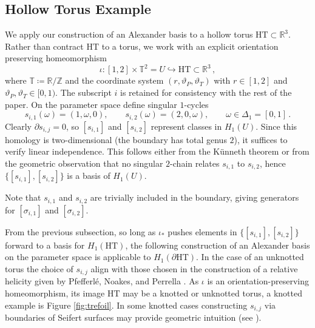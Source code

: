 \documentclass[11pt]{article}
\theoremstyle{plain}
\theoremstyle{definition}
\theoremstyle{remark}
\newcommand{\R}{\mathbb{R}}
\newcommand{\HT}{\mathrm{HT}}
\begin{document}
\subsection{Hollow Torus Example} \label{append:example}




We apply our construction of an Alexander basis to a hollow torus \(\HT\subset\R^3\). Rather than contract \(\HT\) to a torus, we work with an explicit orientation preserving homeomorphism
\[
\iota:[1,2]\times \mathbb{T}^2 = U \hookrightarrow \HT\subset\R^3 \, ,
\]
where \(\mathbb{T} \coloneqq \R / \mathbb{Z}\) and the coordinate system \((r,\vartheta_P,\vartheta_T)\) with \(r\in[1,2]\) and \(\vartheta_P,\vartheta_T\in[0,1)\). The subscript \(i\) is retained for consistency with the rest of the paper. On the parameter space define singular \(1\)-cycles
\[
s_{i,1}(\omega )=(1,\omega ,0),\qquad s_{i,2}(\omega )=(2,0, \omega ),\qquad \omega \in\Delta_1=[0,1] \, .
\]
Clearly \(\partial s_{i,j}=0\), so \([s_{i,1}]\) and \([s_{i,2}]\) represent classes in \(H_1( U  )\). Since this homology is two-dimensional (the boundary has total genus \(2\)), it suffices to verify linear independence. This follows either from the K\"unneth theorem or from the geometric observation that no singular \(2\)-chain relates \(s_{i,1}\) to \(s_{i,2}\), hence \(\{[s_{i,1}],[s_{i,2}]\}\) is a basis of \(H_1(  U  )\). 

Note that \(s_{i,1}\) and \(s_{i,2}\) are trivially included in the boundary, giving generators for \([\sigma_{i,1}]\) and \([\sigma_{i,2}]\). 

From the previous subsection, so long as \( \iota_* \) pushes elements in \(\{[s_{i,1}],[s_{i,2}]\}\) forward to a basis for \(H_1( \HT)\), the following construction of an Alexander basis on the parameter space is applicable to \(H_1(\partial \HT)\). In the case of an unknotted torus the choice of \(s_{i,j}\) align with those chosen in the construction of a relative helicity given by Pfefferlé, Noakes, and Perrella \cite{Gauge_freedom}. As \(\iota\) is an orientation-preserving homeomorphism, its image \(\HT\) may be a knotted or unknotted torus, a knotted example is Figure \ref{fig:trefoil}. In some knotted cases constructing \(s_{i,j}\) via boundaries of Seifert surfaces may provide geometric intuition (see \cite{seifert1935geschlecht}). 
\end{document}
